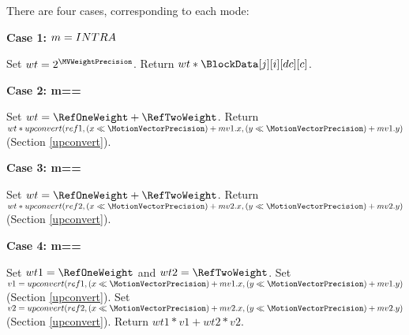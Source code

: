 There are four cases, corresponding to
each mode:

{\bf Case 1: $m=INTRA$ }

Set $wt=2^\MVWeightPrecision$. \newline
Return $wt*\BlockData[j][i][dc][c]$.

{\bf Case 2: m==\RefOneOnly}

Set $wt=\RefOneWeight+\RefTwoWeight$. \newline
Return $wt*upconvert(ref1, (x\ll \MotionVectorPrecision)+mv1.x, (y\ll \MotionVectorPrecision)+mv1.y)$ (Section \ref{upconvert}).

{\bf Case 3: m==\RefTwoOnly}

Set $wt=\RefOneWeight+\RefTwoWeight$. \newline
Return $wt*upconvert(ref2, (x\ll \MotionVectorPrecision)+mv2.x, (y\ll \MotionVectorPrecision)+mv2.y)$ (Section \ref{upconvert}).

{\bf Case 4: m==\RefOneAndTwo}

Set $wt1=\RefOneWeight$ and $wt2=\RefTwoWeight$. \newline
Set $v1=upconvert(ref1, (x\ll \MotionVectorPrecision)+mv1.x, (y\ll \MotionVectorPrecision)+mv1.y)$ (Section \ref{upconvert}). \newline
Set $v2=upconvert(ref2, (x\ll \MotionVectorPrecision)+mv2.x, (y\ll \MotionVectorPrecision)+mv2.y)$ (Section \ref{upconvert}). \newline
Return $wt1*v1+wt2*v2$.

